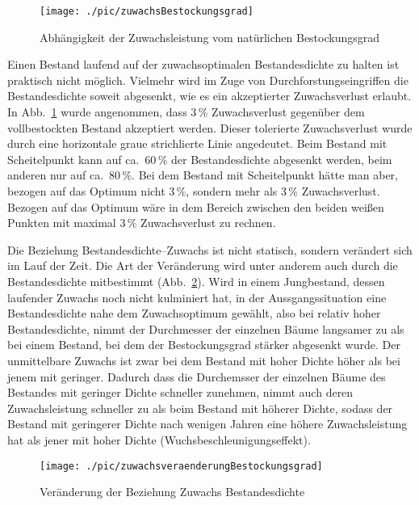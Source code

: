 \documentclass[twocolumn]{scrartcl}
\begin{document}
\begin{figure}[htbp]
  \centering
  \texttt{[image: ./pic/zuwachsBestockungsgrad]}
  \caption{Abhängigkeit der Zuwachsleistung vom natürlichen Bestockungsgrad}
  \label{fig:zuwachsBestockungsgrad}
\end{figure}

Einen Bestand laufend auf der zuwachsoptimalen Bestandesdichte zu halten ist
praktisch nicht möglich. Vielmehr wird im Zuge von Durchforstungseingriffen die
Bestandesdichte soweit abgesenkt, wie es ein akzeptierter Zuwachsverlust
erlaubt. In Abb.~\ref{fig:zuwachsBestockungsgrad} wurde angenommen, dass 3\,\%
Zuwachsverlust gegenüber dem vollbestockten Bestand akzeptiert werden. Dieser
tolerierte Zuwachsverlust wurde durch eine horizontale graue strichlierte Linie
angedeutet. Beim Bestand mit Scheitelpunkt kann auf ca.\ 60\,\% der
Bestandesdichte abgesenkt werden, beim anderen nur auf ca.\ 80\,\%. Bei dem
Bestand mit Scheitelpunkt hätte man aber, bezogen auf das Optimum nicht 3\,\%,
sondern mehr als 3\,\% Zuwachsverlust. Bezogen auf das Optimum wäre in dem
Bereich zwischen den beiden weißen Punkten mit maximal 3\,\% Zuwachsverlust zu
rechnen.

Die Beziehung Bestandesdichte--Zuwachs ist nicht statisch, sondern verändert
sich im Lauf der Zeit. Die Art der Veränderung wird unter anderem auch durch die
Bestandesdichte mitbestimmt (Abb.~\ref{fig:zuwachsveraenderungBestockungsgrad}).
Wird in einem Jungbestand, dessen laufender Zuwachs noch nicht kulminiert hat,
in der Aussgangssituation eine Bestandesdichte nahe dem Zuwachsoptimum gewählt,
also bei relativ hoher Bestandesdichte, nimmt der Durchmesser der einzelnen
Bäume langsamer zu als bei einem Bestand, bei dem der Bestockungsgrad stärker
abgesenkt wurde. Der unmittelbare Zuwachs ist zwar bei dem Bestand mit hoher
Dichte höher als bei jenem mit geringer. Dadurch dass die Durchemsser der
einzelnen Bäume des Bestandes mit geringer Dichte schneller zunehmen, nimmt auch
deren Zuwachsleistung schneller zu als beim Bestand mit höherer Dichte, sodass
der Bestand mit geringerer Dichte nach wenigen Jahren eine höhere
Zuwachsleistung hat als jener mit hoher Dichte (Wuchsbeschleunigungseffekt).

\begin{figure}[htbp]
  \centering
  \texttt{[image: ./pic/zuwachsveraenderungBestockungsgrad]}
  \caption{Veränderung der Beziehung Zuwachs Bestandesdichte}
  \label{fig:zuwachsveraenderungBestockungsgrad}
\end{figure}
\end{document}
